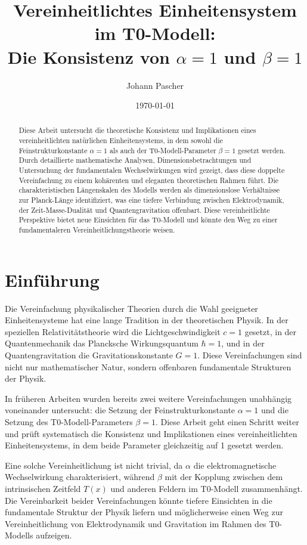 \documentclass[12pt,a4paper]{article}
\title{Vereinheitlichtes Einheitensystem im T0-Modell: \\Die Konsistenz von $\alpha = 1$ und $\beta = 1$}
\author{Johann Pascher}
\date{\today}
\newcommand{\Tfield}{T(x)}
\begin{document}
	
	\maketitle
	
	\begin{abstract}
		Diese Arbeit untersucht die theoretische Konsistenz und Implikationen eines vereinheitlichten natürlichen Einheitensystems, in dem sowohl die Feinstrukturkonstante $\alpha = 1$ als auch der T0-Modell-Parameter $\beta = 1$ gesetzt werden. Durch detaillierte mathematische Analysen, Dimensionsbetrachtungen und Untersuchung der fundamentalen Wechselwirkungen wird gezeigt, dass diese doppelte Vereinfachung zu einem kohärenten und eleganten theoretischen Rahmen führt. Die charakteristischen Längenskalen des Modells werden als dimensionslose Verhältnisse zur Planck-Länge identifiziert, was eine tiefere Verbindung zwischen Elektrodynamik, der Zeit-Masse-Dualität und Quantengravitation offenbart. Diese vereinheitlichte Perspektive bietet neue Einsichten für das T0-Modell und könnte den Weg zu einer fundamentaleren Vereinheitlichungstheorie weisen.
	\end{abstract}
	
	\tableofcontents
	\newpage
	
	\section{Einführung}
	
	Die Vereinfachung physikalischer Theorien durch die Wahl geeigneter Einheitensysteme hat eine lange Tradition in der theoretischen Physik. In der speziellen Relativitätstheorie wird die Lichtgeschwindigkeit $c = 1$ gesetzt, in der Quantenmechanik das Plancksche Wirkungsquantum $\hbar = 1$, und in der Quantengravitation die Gravitationskonstante $G = 1$. Diese Vereinfachungen sind nicht nur mathematischer Natur, sondern offenbaren fundamentale Strukturen der Physik.
	
	In früheren Arbeiten \cite{pascher_alpha_2025, pascher_beta_2025} wurden bereits zwei weitere Vereinfachungen unabhängig voneinander untersucht: die Setzung der Feinstrukturkonstante $\alpha = 1$ und die Setzung des T0-Modell-Parameters $\beta = 1$. Diese Arbeit geht einen Schritt weiter und prüft systematisch die Konsistenz und Implikationen eines vereinheitlichten Einheitensystems, in dem beide Parameter gleichzeitig auf 1 gesetzt werden.
	
	Eine solche Vereinheitlichung ist nicht trivial, da $\alpha$ die elektromagnetische Wechselwirkung charakterisiert, während $\beta$ mit der Kopplung zwischen dem intrinsischen Zeitfeld $\Tfield$ und anderen Feldern im T0-Modell zusammenhängt. Die Vereinbarkeit beider Vereinfachungen könnte tiefere Einsichten in die fundamentale Struktur der Physik liefern und möglicherweise einen Weg zur Vereinheitlichung von Elektrodynamik und Gravitation im Rahmen des T0-Modells aufzeigen.
	
\end{document}
